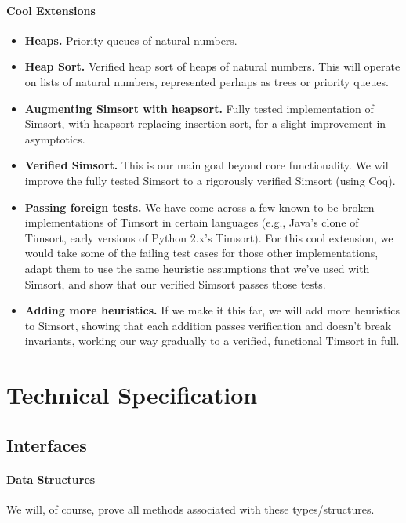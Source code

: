 \documentclass{article}
\begin{document}
\paragraph{Cool Extensions}
\begin{itemize}
  \item \textbf{Heaps.}
    Priority queues of natural numbers.
  \item \textbf{Heap Sort.}
    Verified heap sort of heaps of natural numbers.
    This will operate on lists of natural numbers, represented perhaps
    as trees or priority queues.
  \item \textbf{Augmenting Simsort with heapsort.}
    Fully tested implementation of Simsort, with heapsort replacing
    insertion sort, for a slight improvement in asymptotics.
  \item \textbf{Verified Simsort.}
    This is our main goal beyond core functionality.
    We will improve the fully tested Simsort to
    a rigorously verified Simsort (using Coq).
  \item \textbf{Passing foreign tests.}
    We have come across a few known to be broken implementations of Timsort
    in certain languages (e.g., Java's clone of Timsort,
    early versions of Python 2.x's Timsort).
    For this cool extension, we would take some of the failing test cases for
    those other implementations, adapt them to use the same heuristic
    assumptions that we've used with Simsort, and show that our verified
    Simsort passes those tests.
  \item \textbf{Adding more heuristics.}
    If we make it this far, we will add more heuristics to Simsort,
    showing that each addition passes verification and doesn't break
    invariants, working our way gradually to a verified, functional
    Timsort in full.
\end{itemize}


\section{Technical Specification}
\subsection{Interfaces}
\paragraph{Data Structures}
We will, of course, prove all methods associated with these types/structures.
\end{document}
